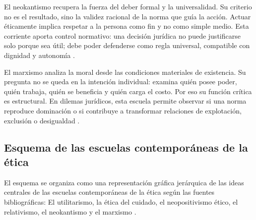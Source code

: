 \documentclass[
	spanish, %
	letterpaper, oneside
]{article}
\begin{document}
El neokantismo recupera la fuerza del deber formal y la universalidad. Su criterio no es el resultado, sino la validez racional de la norma que guía la acción. Actuar éticamente implica respetar a la persona como fin y no como simple medio. Esta corriente aporta control normativo: una decisión jurídica no puede justificarse solo porque sea útil; debe poder defenderse como regla universal, compatible con dignidad y autonomía \citep{huertaEticaConClasicos2000,ronquilloarmasEticaGeneralProfesional2018}.

El marxismo analiza la moral desde las condiciones materiales de existencia. Su pregunta no se queda en la intención individual: examina quién posee poder, quién trabaja, quién se beneficia y quién carga el costo. Por eso su función crítica es estructural. En dilemas jurídicos, esta escuela permite observar si una norma reproduce dominación o si contribuye a transformar relaciones de explotación, exclusión o desigualdad \citep{huertaEticaConClasicos2000,ronquilloarmasEticaGeneralProfesional2018}.

\subsection{Esquema de las escuelas contemporáneas de la ética}

El esquema se organiza como una representación gráfica jerárquica de las ideas centrales de las escuelas contemporáneas de la ética según las fuentes bibliográficas: El utilitarismo, la ética del cuidado, el neopositivismo ético, el relativismo, el neokantismo y el marxismo \citep{lopezmartinezTecnicasDidacticas2023}.
\end{document}
